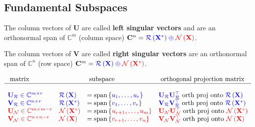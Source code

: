 \documentclass[14pt]{article}
\theoremstyle{definition}
\theoremstyle{remark}
\begin{document}
\subsection*{Fundamental Subspaces}
The column vectors of $\mathbf{U}$ are called \textbf{left singular vectors} and are an orthonormal span of
$\mathbb{C}^m$ (column space) $\mathbf{C}^{n} =
    \color{blue}{\mathcal{R} \left( \mathbf{X}^{*} \right)} \oplus
    \color{red}{\mathcal{N} \left( \mathbf{X} \right)}$.

The column vectors of $\mathbf{V}$ are called \textbf{right singular vectors}
are an orthonormal span of $\mathbb{C}^n$ (row space) $ \mathbf{C}^{m} =
    \color{blue}{\mathcal{R} \left( \mathbf{X} \right)} \oplus
    \color{red} {\mathcal{N} \left( \mathbf{X}^{*} \right)}$.

$$
    \begin{array}{llll}
        \text{ matrix }   &                                                       & \text{ subspace }  & \text{ orthogonal projection matrix } \\
        \hline\\
        \color{blue}{\mathbf{U}_{\mathcal{R}}}\in\mathbb{C}^{m\times r}  &
        \color{blue}{\mathcal{R}\left(\mathbf{X}\right)}                 & =
        \text{span}\left\{\color{blue}{u_{1}},\dots,\color{blue}{u_{r}}\right\}
        &  {\color{blue}\mathbf{U}_{\mathcal{R}}} {\color{blue}\mathbf{U}_{\mathcal{R}}^\top}  \text{ orth proj onto }  {\color{blue}\mathcal{R}\left(\mathbf{X}\right)}  \\
        \color{blue}{\mathbf{V}_{\mathcal{R}}}\in\mathbb{C}^{n\times r}  &
        \color{blue}{\mathcal{R}\left(\mathbf{X}^{*}\right)}             & =
        \text{span}\left\{\color{blue}{v_{1}},\dots,\color{blue}{v_{r}}\right\}   
        &  {\color{blue}\mathbf{V}_{\mathcal{R}}} {\color{blue}\mathbf{V}_{\mathcal{R}}^\top}  \text{ orth proj onto }  {\color{blue}\mathcal{R}\left(\mathbf{X}^*\right)}  \\
        \color{red}{\mathbf{U}_{\mathcal{N}}}\in\mathbb{C}^{m\times m-r} &
        \color{red}{\mathcal{N}\left(\mathbf{X^{*}}\right)}              & =
        \text{span}\left\{\color{red}{u_{r+1}},\dots,\color{red}{u_{m}}\right\} 
        &  {\color{red}\mathbf{U}_{\mathcal{N}}} {\color{red}\mathbf{U}_{\mathcal{N}}^\top}  \text{ orth proj onto }  {\color{red}\mathcal{N}\left(\mathbf{X^{*}}\right)}     \\
        \color{red}{\mathbf{V}_{\mathcal{N}}}\in\mathbb{C}^{n\times n-r} &
        \color{red}{\mathcal{N}\left(\mathbf{X}\right)}                  & =
        \text{span}\left\{\color{red}{v_{r+1}},\dots,\color{red}{v_{n}}\right\}  
        &  {\color{red}\mathbf{V}_{\mathcal{N}}}{\color{red}\mathbf{V}_{\mathcal{N}}^\top}  \text{ orth proj onto }  {\color{red}\mathcal{N}\left(\mathbf{X}\right)}   \\
    \end{array}
$$
\end{document}

